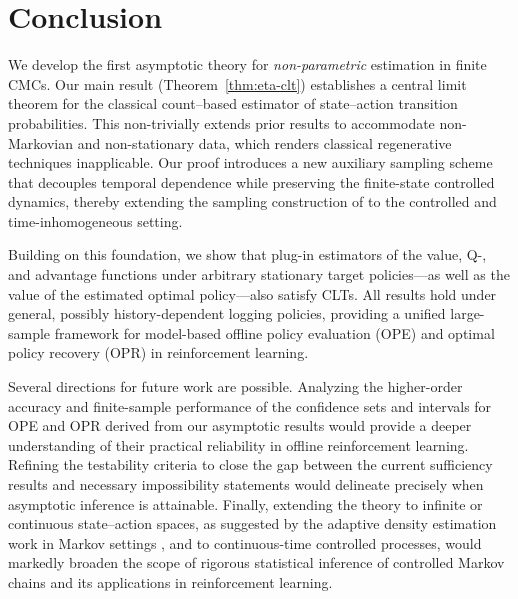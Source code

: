 \documentclass[twoside,11pt]{article}
\numberwithin{equation}{section}
\begin{document}
\section{Conclusion}\label{sec:conclusion}

We develop the first asymptotic theory for \emph{non-parametric} estimation in finite CMCs. 
Our main result (Theorem~\ref{thm:eta-clt}) establishes a central limit theorem for the classical count–based estimator of state–action transition probabilities.
This non-trivially extends prior results to accommodate non-Markovian and non-stationary data, which renders classical regenerative techniques inapplicable.
Our proof introduces a new auxiliary sampling scheme that decouples temporal dependence while preserving the finite-state controlled dynamics, thereby extending the sampling construction of \citet{billingsley1961statistical} to the controlled and time-inhomogeneous setting.

Building on this foundation, we show that plug-in estimators of the value, Q-, and advantage functions under arbitrary stationary target policies—as well as the value of the estimated optimal policy—also satisfy CLTs.
All results hold under general, possibly history-dependent logging policies, providing a unified large-sample framework for model-based offline policy evaluation (OPE) and optimal policy recovery (OPR) in reinforcement learning.

Several directions for future work are possible. 
Analyzing the higher-order accuracy and finite-sample performance of the confidence sets and intervals for OPE and OPR derived from our asymptotic results would provide a deeper understanding of their practical reliability in offline reinforcement learning.
Refining the testability criteria to close the gap between the current sufficiency results and necessary impossibility statements would delineate precisely when asymptotic inference is attainable. 
Finally, extending the theory to infinite \citep{kontorovich_concentration_2008} or continuous state–action spaces, as suggested by the adaptive density estimation work in Markov settings \citep{sart_estimation_2014}, and to continuous-time controlled processes, would markedly broaden the scope of rigorous statistical inference of controlled Markov chains and its applications in reinforcement learning.
\end{document}
